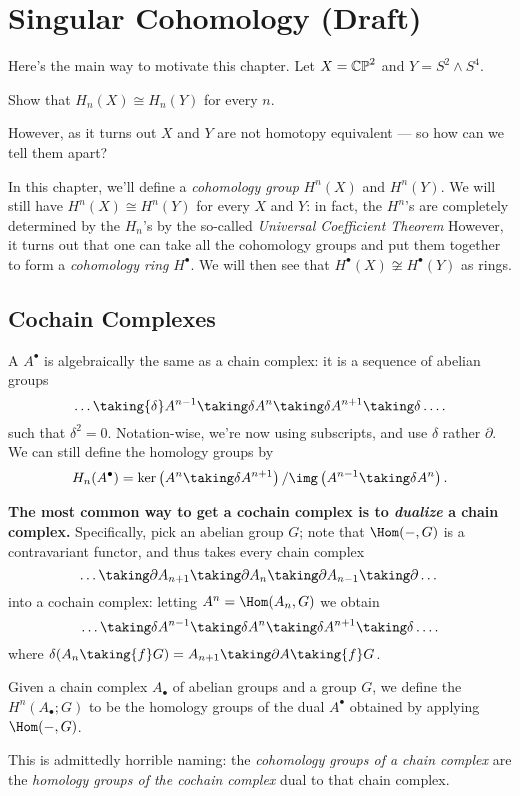 \chapter{Singular Cohomology (Draft)}
Here's the main way to motivate this chapter.
Let $X = \mathbb{CP}^2$ and $Y = S^2 \wedge S^4$.
\begin{exercise}
	Show that $H_n(X) \cong H_n(Y)$ for every $n$.
\end{exercise}
However, as it turns out $X$ and $Y$ are not homotopy equivalent --- so how can we tell them apart?

In this chapter, we'll define a \emph{cohomology group} $H^n(X)$ and $H^n(Y)$.
We will still have $H^n(X) \cong H^n(Y)$ for every $X$ and $Y$:
in fact, the $H^n$'s are completely determined by the $H_n$'s
by the so-called \emph{Universal Coefficient Theorem}
However, it turns out that one can take all the cohomology groups and put
them together to form a \emph{cohomology ring} $H^\bullet$.
We will then see that $H^\bullet(X) \not\cong H^\bullet(Y)$ as rings.

\section{Cochain Complexes}
\begin{definition}
A  $A^\bullet$ is algebraically the same as a chain complex:
it is a sequence of abelian groups
\[ \dots \taking{\delta} A^{n-1} \taking\delta A^n \taking\delta A^{n+1} \taking\delta \dots. \]
such that $\delta^2 = 0$.
Notation-wise, we're now using subscripts, and use $\delta$ rather $\partial$.
We can still define the homology groups by
\[ H_n(A^\bullet) = \ker\left( A^n \taking\delta A^{n+1} \right)
	/ \img\left( A^{n-1} \taking\delta A^n \right). \]
\end{definition}

\textbf{The most common way to get a cochain complex
is to \emph{dualize} a chain complex.}
Specifically, pick an abelian group $G$;
note that $\Hom(-, G)$ is a contravariant functor,
and thus takes every chain complex
\[ \dots \taking\partial A_{n+1} \taking\partial
	A_n \taking\partial A_{n-1} \taking\partial \dots \]
into a cochain complex: letting $A^n = \Hom(A_n, G)$ we obtain
\[ \dots \taking\delta A^{n-1} \taking\delta
	A^n \taking\delta A^{n+1} \taking\delta \dots. \]
where $\delta(A_n \taking{f} G) = A_{n+1} \taking\partial A \taking{f} G$.
\begin{definition}
	Given a chain complex $A_\bullet$ of abelian groups and a group $G$,
	we define the  $H^n(A_\bullet; G)$ to be the
	homology groups of the dual $A^\bullet$ obtained by applying $\Hom(-,G)$.
\end{definition}
This is admittedly horrible naming:
the \emph{cohomology groups of a chain complex}
are the \emph{homology groups of the cochain complex}
dual to that chain complex.

